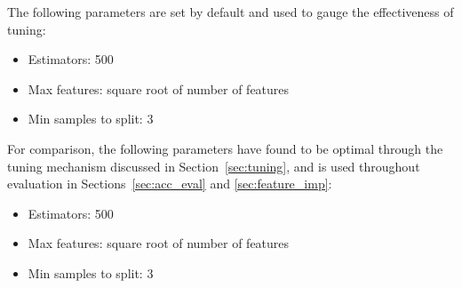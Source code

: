 The following parameters are set by default and used to gauge the effectiveness
of tuning:
\begin{itemize}
  \item Estimators: 500
  \item Max features: square root of number of features
  \item Min samples to split: 3
\end{itemize}

For comparison, the following parameters have found to be optimal through the tuning mechanism
discussed in Section~\ref{sec:tuning}, and is used throughout evaluation in
Sections~\ref{sec:acc_eval} and \ref{sec:feature_imp}:
\begin{itemize}
  \item Estimators: 500
  \item Max features: square root of number of features
  \item Min samples to split: 3
\end{itemize}
